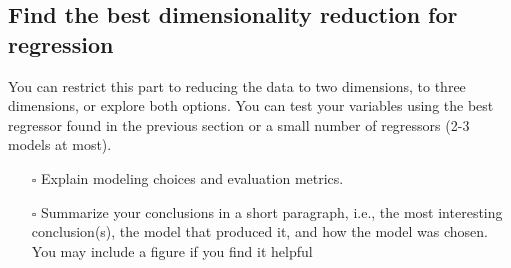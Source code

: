 \documentclass[
  letterpaper,
  DIV=11,
  numbers=noendperiod]{scrartcl}
\providecommand{\tightlist}{%
  \setlength{\itemsep}{0pt}\setlength{\parskip}{0pt}}\usepackage{longtable,booktabs,array}
\begin{document}
\subsection{Find the best dimensionality reduction for
regression}\label{find-the-best-dimensionality-reduction-for-regression}

You can restrict this part to reducing the data to two dimensions, to
three dimensions, or explore both options. You can test your variables
using the best regressor found in the previous section or a small number
of regressors (2-3 models at most).

\begin{itemize}
\tightlist
\item[$\square$]
  Explain modeling choices and evaluation metrics.
\item[$\square$]
  Summarize your conclusions in a short paragraph, i.e., the most
  interesting conclusion(s), the model that produced it, and how the
  model was chosen. You may include a figure if you find it helpful
\end{itemize}
\end{document}
